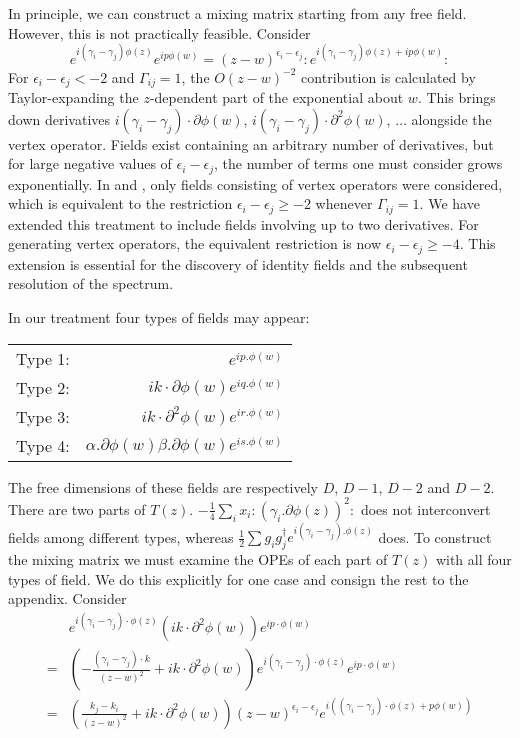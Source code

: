 \documentclass[a4paper,a4paper]{article}
\begin{document}
In principle, we can construct a mixing matrix starting from any free field. However, this is not practically feasible.
Consider 
\begin{displaymath}
e^{i(\gamma_i - \gamma_j)\phi(z)} e^{ip\phi(w)} = (z - w)^{\epsilon_i - \epsilon_j} : e^{i(\gamma_i - \gamma_j)\phi(z) + ip\phi(w)} :
\end{displaymath}
For $\epsilon_i - \epsilon_j < -2$ and $\Gamma_{ij}=1$, the $O(z-w)^{-2}$ contribution is calculated by Taylor-expanding the 
$z$-dependent part of the exponential about $w$. This brings down derivatives $i(\gamma_i - \gamma_j)\cdot\partial\phi(w)$,
$i(\gamma_i - \gamma_j)\cdot\partial^2\phi(w)$, $\ldots$ alongside the vertex operator. 
Fields exist containing an arbitrary number of derivatives, but for large negative values of $\epsilon_i - \epsilon_j$,
the number of terms one must consider grows exponentially. In \cite{Gepner} and \cite{Cohen}, only
fields consisting of vertex operators were considered,
which is equivalent to the restriction $\epsilon_i - \epsilon_j \ge -2$
 whenever $\Gamma_{ij} = 1$.
We have extended this treatment to include fields involving up to two derivatives.
For generating vertex operators, the equivalent restriction is now
$\epsilon_i - \epsilon_j \ge -4$. 
This extension is essential for the discovery of identity fields and the subsequent resolution
of the spectrum. 

In our treatment four types of fields may appear:
\newline

\begin{tabular}{lr}
Type 1: & $e^{ip.\phi(w)} $ \\
Type 2: &$ik\cdot\partial\phi(w)e^{iq.\phi(w)}$ \\
Type 3: &$ik\cdot\partial^2\phi(w)e^{ir.\phi(w)}$ \\
Type 4: &$\alpha.\partial\phi(w)\beta.\partial\phi(w)e^{is.\phi(w)}$ 
\end{tabular}
\newline

The free dimensions of these fields are
respectively $D$, $D-1$, $D-2$ and $D-2$.
There are two parts of $T(z)$. $-\frac{1}{4} \sum_i x_i : ( \gamma_i . \partial\phi(z) ) ^2 :$
does not interconvert fields among different types, whereas $\frac{1}{2} \sum g_i g_j^{\dagger} e^{i(\gamma_i - \gamma_j).\phi(z)}$
does. To construct the mixing matrix we must examine the OPEs of each
part of $T(z)$ with all four types of field. We do this explicitly for one case and consign the rest to the appendix. Consider 
\begin{eqnarray}
& e^{i(\gamma_i - \gamma_j)\cdot\phi(z)} (ik\cdot\partial^2\phi(w))e^{ip\cdot\phi(w)} \nonumber\\
= & \left( -\frac{(\gamma_i - \gamma_j)\cdot k}{(z-w)^2} + ik\cdot\partial^2\phi(w) \right)e^{i(\gamma_i - \gamma_j)\cdot\phi(z)}e^{ip\cdot\phi(w)} \nonumber\\
= & \left( \frac{k_j - k_i}{(z-w)^2} + ik\cdot\partial^2\phi(w) \right) (z-w)^{\epsilon_i - \epsilon_j} e^{i((\gamma_i - \gamma_j)\cdot\phi(z) + p\phi(w))} \nonumber
\end{eqnarray}
\end{document}

